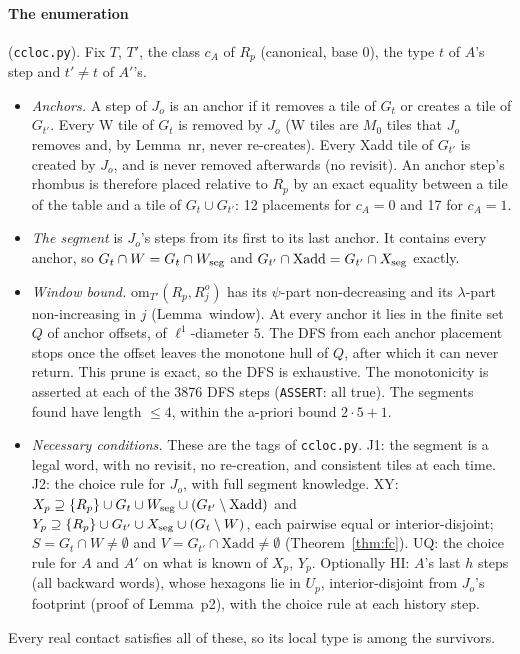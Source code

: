 \documentclass[11pt]{article}
\theoremstyle{definition}\newtheorem{definition}[theorem]{Definition}\newtheorem{remark}[theorem]{Remark}
\begin{document}
\paragraph{The enumeration} (\texttt{ccloc.py}). Fix $T$, $T'$, the class $c_A$ of $R_p$ (canonical, base $0$), the type $t$ of $A$'s step and $t'\ne t$ of $A'$'s.
\begin{itemize}
\item \emph{Anchors.} A step of $J_o$ is an anchor if it removes a tile of $G_t$ or creates a tile of $G_{t'}$. Every W tile of $G_t$ is removed by $J_o$ (W tiles are $M_0$ tiles that $J_o$ removes and, by Lemma~nr, never re-creates). Every Xadd tile of $G_{t'}$ is created by $J_o$, and is never removed afterwards (no revisit). An anchor step's rhombus is therefore placed relative to $R_p$ by an exact equality between a tile of the table and a tile of $G_t\cup G_{t'}$: 12 placements for $c_A=0$ and 17 for $c_A=1$.
\item \emph{The segment} is $J_o$'s steps from its first to its last anchor. It contains every anchor, so $G_t\cap W=G_t\cap W_{\rm seg}$ and $G_{t'}\cap\mathrm{Xadd}=G_{t'}\cap X_{\rm seg}$ exactly.
\item \emph{Window bound.} $\mathrm{om}_{T'}(R_p,R^o_j)$ has its $\psi$-part non-decreasing and its $\lambda$-part non-increasing in $j$ (Lemma~window). At every anchor it lies in the finite set $Q$ of anchor offsets, of $\ell^1$-diameter $5$. The DFS from each anchor placement stops once the offset leaves the monotone hull of $Q$, after which it can never return. This prune is exact, so the DFS is exhaustive. The monotonicity is asserted at each of the 3876 DFS steps (\texttt{ASSERT}: all true). The segments found have length $\le4$, within the a-priori bound $2\cdot5+1$.
\item \emph{Necessary conditions.} These are the tags of \texttt{ccloc.py}. J1: the segment is a legal word, with no revisit, no re-creation, and consistent tiles at each time. J2: the choice rule for $J_o$, with full segment knowledge. XY: $X_p\supseteq\{R_p\}\cup G_t\cup W_{\rm seg}\cup(G_{t'}\setminus\mathrm{Xadd})$ and $Y_p\supseteq\{R_p\}\cup G_{t'}\cup X_{\rm seg}\cup(G_t\setminus W)$, each pairwise equal or interior-disjoint; $S=G_t\cap W\ne\emptyset$ and $V=G_{t'}\cap\mathrm{Xadd}\ne\emptyset$ (Theorem~\ref{thm:fc}). UQ: the choice rule for $A$ and $A'$ on what is known of $X_p$, $Y_p$. Optionally HI: $A$'s last $h$ steps (all backward words), whose hexagons lie in $U_p$, interior-disjoint from $J_o$'s footprint (proof of Lemma~p2), with the choice rule at each history step.
\end{itemize}
Every real contact satisfies all of these, so its local type is among the survivors.
\end{document}
